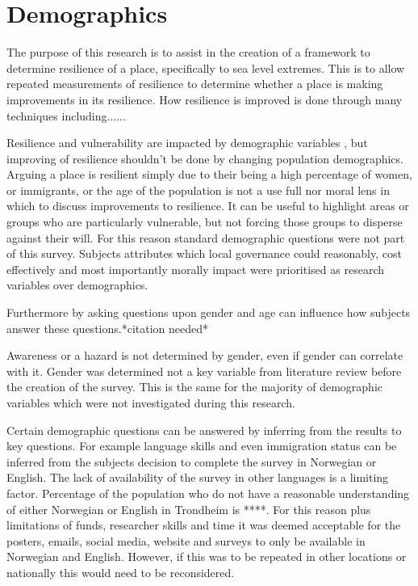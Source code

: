 
\section{Demographics}
The purpose of this research is to assist in the creation of a framework to determine resilience of a place, specifically to sea level extremes. This is to allow repeated measurements of resilience to determine whether a place is making improvements in its resilience. How resilience is improved is done through many techniques including......

Resilience and vulnerability are impacted by demographic variables \cite{rod_integrated_2012}, but improving of resilience shouldn't be done by changing population demographics. Arguing a place is resilient simply due to their being a high percentage of women, or immigrants, or the age of the population is not a use full nor moral lens in which to discuss improvements to resilience. It can be useful to highlight areas or groups who are particularly vulnerable, but not forcing those groups to disperse against their will. For this reason standard demographic questions were not part of this survey. Subjects attributes which local governance could reasonably, cost effectively and most importantly morally impact were prioritised as research variables over demographics. 

Furthermore by asking questions upon gender and age can influence how subjects answer these questions.*citation needed*

Awareness or a hazard is not determined by gender, even if gender can correlate with it.  Gender was determined not a key variable from literature review before the creation of the survey. This is the same for the majority of demographic variables which were not investigated during this research.

Certain demographic questions can be answered by inferring from the results to key questions. For example language skills and even immigration status can be inferred from the subjects decision to complete the survey in Norwegian or English. The lack of availability of the survey in other languages is a limiting factor. Percentage of the population who do not have a reasonable understanding of either Norwegian or English in Trondheim is ****. For this reason plus limitations of funds, researcher skills and time it was deemed acceptable for the posters, emails, social media, website and surveys to only be available in Norwegian and English. However, if this was to be repeated in other locations or nationally this would need to be reconsidered. 

